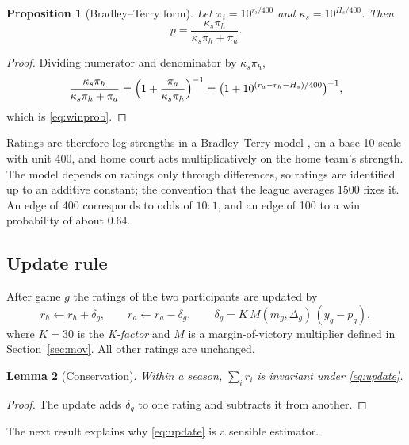 \documentclass[11pt]{article}
\newcommand{\Kval}{30}             %
\newcommand{\rmean}{1500}          %
\theoremstyle{plain}
\newtheorem{proposition}{Proposition}
\newtheorem{lemma}[proposition]{Lemma}
\theoremstyle{definition}
\theoremstyle{remark}
\begin{document}
\begin{proposition}[Bradley--Terry form]\label{prop:bt}
Let $\pi_i = 10^{r_i/400}$ and $\kappa_s = 10^{H_s/400}$. Then
\[
  p = \frac{\kappa_s \pi_h}{\kappa_s \pi_h + \pi_a}.
\]
\end{proposition}
\begin{proof}
Dividing numerator and denominator by $\kappa_s\pi_h$,
\[
  \frac{\kappa_s \pi_h}{\kappa_s \pi_h + \pi_a} = \Bigl(1 + \frac{\pi_a}{\kappa_s \pi_h}\Bigr)^{-1} = \bigl(1 + 10^{(r_a - r_h - H_s)/400}\bigr)^{-1},
\]
which is \eqref{eq:winprob}.
\end{proof}

Ratings are therefore log-strengths in a Bradley--Terry model \cite{bradley1952}, on a base-10 scale with unit 400, and home court acts multiplicatively on the home team's strength. The model depends on ratings only through differences, so ratings are identified up to an additive constant; the convention that the league averages $\rmean$ fixes it. An edge of 400 corresponds to odds of $10\!:\!1$, and an edge of 100 to a win probability of about $0.64$.

\subsection{Update rule}

After game $g$ the ratings of the two participants are updated by
\begin{equation}\label{eq:update}
  r_h \leftarrow r_h + \delta_g, \qquad r_a \leftarrow r_a - \delta_g, \qquad
  \delta_g = K \, M(m_g, \Delta_g)\, (y_g - p_g),
\end{equation}
where $K = \Kval$ is the \emph{K-factor} and $M$ is a margin-of-victory multiplier defined in Section~\ref{sec:mov}. All other ratings are unchanged.

\begin{lemma}[Conservation]
Within a season, $\sum_i r_i$ is invariant under \eqref{eq:update}.
\end{lemma}
\begin{proof}
The update adds $\delta_g$ to one rating and subtracts it from another.
\end{proof}

The next result explains why \eqref{eq:update} is a sensible estimator.
\end{document}
